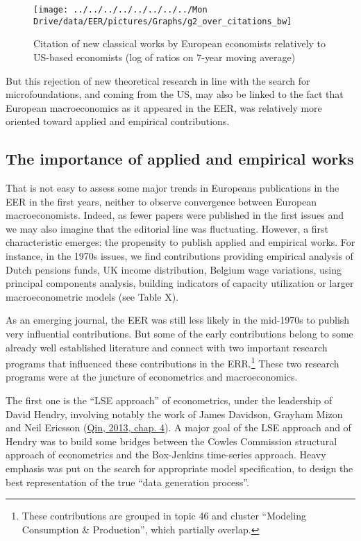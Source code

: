 \documentclass[
  12pt,
  onecolumn]{article}
\begin{document}
\begin{figure}[h]

{\centering \texttt{[image: ../../../../../../../../Mon Drive/data/EER/pictures/Graphs/g2\_over\_citations\_bw]} 

}

\caption{Citation of new classical works by European economists relatively to US-based economists (log of ratios on 7-year moving average)}\label{fig:plot-new-classical}
\end{figure}

But this rejection of new theoretical research in line with the search
for microfoundations, and coming from the US, may also be linked to the
fact that European macroeconomics as it appeared in the EER, was
relatively more oriented toward applied and empirical contributions.

\hypertarget{the-importance-of-applied-and-empirical-works}{%
\subsection{The importance of applied and empirical
works}\label{the-importance-of-applied-and-empirical-works}}

That is not easy to assess some major trends in Europeans publications
in the EER in the first years, neither to observe convergence between
European macroeconomists. Indeed, as fewer papers were published in the
first issues and we may also imagine that the editorial line was
fluctuating. However, a first characteristic emerges: the propensity to
publish applied and empirical works. For instance, in the 1970s issues,
we find contributions providing empirical analysis of Dutch pensions
funds, UK income distribution, Belgium wage variations, using principal
components analysis, building indicators of capacity utilization or
larger macroeconometric models (see Table X).

As an emerging journal, the EER was still less likely in the mid-1970s
to publish very influential contributions. But some of the early
contributions belong to some already well established literature and
connect with two important research programs that influenced these
contributions in the ERR.\footnote{These contributions are grouped in
  topic 46 and cluster ``Modeling Consumption \& Production'', which
  partially overlap.} These two research programs were at the juncture
of econometrics and macroeconomics.

The first one is the ``LSE approach'' of econometrics, under the
leadership of David Hendry, involving notably the work of James
Davidson, Grayham Mizon and Neil Ericsson
(\protect\hyperlink{ref-qin2013a}{Qin, 2013, chap. 4}). A major goal of
the LSE approach and of Hendry was to build some bridges between the
Cowles Commission structural approach of econometrics and the
Box-Jenkins time-series approach. Heavy emphasis was put on the search
for appropriate model specification, to design the best representation
of the true ``data generation process''.
\end{document}
